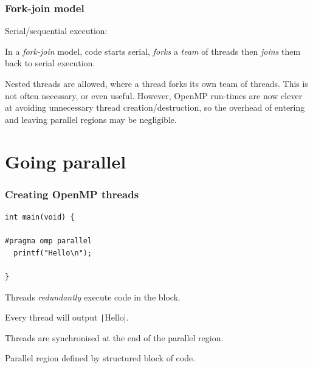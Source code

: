 \documentclass[aspectratio=169]{beamer}
\begin{document}
\begin{frame}
\frametitle{Fork-join model}
Serial/sequential execution:
\begin{center}
\end{center}

\pause

In a \emph{fork-join} model, code starts serial, \emph{forks} a \emph{team} of threads then \emph{joins} them back to serial execution.
\begin{center}
\end{center}

Nested threads are allowed, where a thread forks its own team of threads. This is not often necessary, or even useful. However, OpenMP run-times are now clever at avoiding unnecessary thread creation/destruction, so the overhead of entering and leaving parallel regions may be negligible.
\end{frame}

\section{Going parallel}
\begin{frame}[fragile]
\frametitle{Creating OpenMP threads}
\begin{verbatim}
int main(void) {

#pragma omp parallel
  printf("Hello\n");

}
\end{verbatim}

Threads \emph{redundantly} execute code in the block.

Every thread will output \texttt|Hello|.

Threads are synchronised at the end of the parallel region.

Parallel region defined by structured block of code.

\end{frame}
\end{document}
